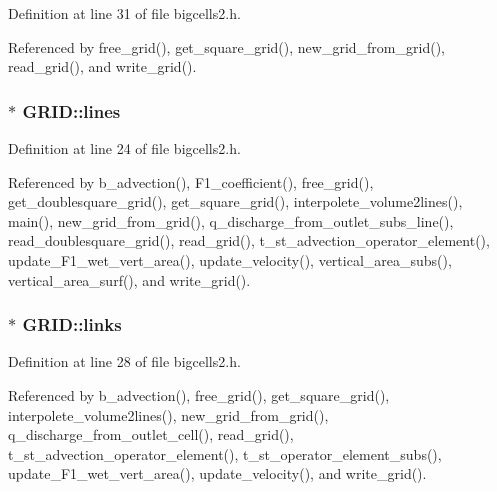 Definition at line 31 of file bigcells2.\-h.



Referenced by free\-\_\-grid(), get\-\_\-square\-\_\-grid(), new\-\_\-grid\-\_\-from\-\_\-grid(), read\-\_\-grid(), and write\-\_\-grid().

\hypertarget{struct_g_r_i_d_a65a058e32255633bf023ba3de077dec4}{
\subsubsection[{lines}]{$\ast$ G\-R\-I\-D\-::lines}}\label{struct_g_r_i_d_a65a058e32255633bf023ba3de077dec4}


Definition at line 24 of file bigcells2.\-h.



Referenced by b\-\_\-advection(), F1\-\_\-coefficient(), free\-\_\-grid(), get\-\_\-doublesquare\-\_\-grid(), get\-\_\-square\-\_\-grid(), interpolete\-\_\-volume2lines(), main(), new\-\_\-grid\-\_\-from\-\_\-grid(), q\-\_\-discharge\-\_\-from\-\_\-outlet\-\_\-subs\-\_\-line(), read\-\_\-doublesquare\-\_\-grid(), read\-\_\-grid(), t\-\_\-st\-\_\-advection\-\_\-operator\-\_\-element(), update\-\_\-\-F1\-\_\-wet\-\_\-vert\-\_\-area(), update\-\_\-velocity(), vertical\-\_\-area\-\_\-subs(), vertical\-\_\-area\-\_\-surf(), and write\-\_\-grid().

\hypertarget{struct_g_r_i_d_a591d9702b42d9fd3d247a964574db173}{
\subsubsection[{links}]{$\ast$ G\-R\-I\-D\-::links}}\label{struct_g_r_i_d_a591d9702b42d9fd3d247a964574db173}


Definition at line 28 of file bigcells2.\-h.



Referenced by b\-\_\-advection(), free\-\_\-grid(), get\-\_\-square\-\_\-grid(), interpolete\-\_\-volume2lines(), new\-\_\-grid\-\_\-from\-\_\-grid(), q\-\_\-discharge\-\_\-from\-\_\-outlet\-\_\-cell(), read\-\_\-grid(), t\-\_\-st\-\_\-advection\-\_\-operator\-\_\-element(), t\-\_\-st\-\_\-operator\-\_\-element\-\_\-subs(), update\-\_\-\-F1\-\_\-wet\-\_\-vert\-\_\-area(), update\-\_\-velocity(), and write\-\_\-grid().

